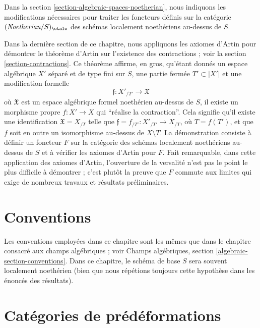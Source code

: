 \medskip\noindent
Dans la section \ref{section-algebraic-spaces-noetherian},
nous indiquons les modifications nécessaires pour traiter
les foncteurs définis sur la catégorie
$(\textit{Noetherian}/S)_\etale$ des schémas localement noethériens
au-dessus de $S$.

\medskip\noindent
Dans la dernière section de ce chapitre, nous appliquons les axiomes d'Artin
pour démontrer le théorème d'Artin sur l'existence des contractions ; voir la
section \ref{section-contractions}. Ce théorème affirme, en gros, qu'étant donnés un
espace algébrique $X'$ séparé et de type fini sur $S$,
une partie fermée $T' \subset |X'|$ et une modification formelle
$$
\mathfrak{f} : X'_{/T'} \longrightarrow \mathfrak{X}
$$
où $\mathfrak{X}$ est un espace algébrique formel noethérien au-dessus de $S$,
il existe un morphisme propre $f : X' \to X$ qui
``réalise la contraction''. Cela signifie qu'il existe une
identification $\mathfrak{X} = X_{/T}$ telle que
$\mathfrak{f} = f_{/T'} : X'_{/T'} \to X_{/T}$, où $T = f(T')$,
et que $f$ soit en outre un isomorphisme au-dessus de $X \setminus T$. La démonstration consiste
à définir un foncteur $F$ sur la catégorie des schémas localement noethériens
au-dessus de $S$ et à vérifier les axiomes d'Artin pour $F$. Fait remarquable, dans cette
application des axiomes d'Artin, l'ouverture de la versalité n'est pas le point le plus
difficile à démontrer ; c'est plutôt la preuve que $F$ commute aux limites qui exige
de nombreux travaux et résultats préliminaires.




\section{Conventions}
\label{section-conventions}

\noindent
Les conventions employées dans ce chapitre sont les mêmes que dans le
chapitre consacré aux champs algébriques ; voir
Champs algébriques, section \ref{algebraic-section-conventions}.
Dans ce chapitre, le schéma de base $S$ sera souvent localement noethérien
(bien que nous répétions toujours cette hypothèse dans les énoncés
des résultats).





\section{Catégories de prédéformations}
\label{section-predeformation-categories}

